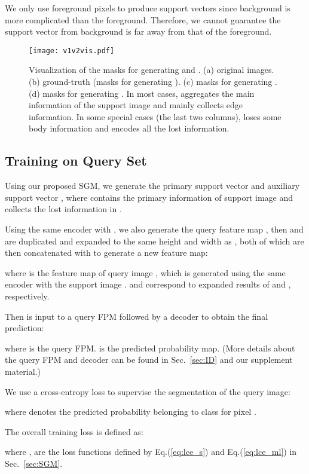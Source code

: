 \documentclass[final]{cvpr}
\begin{document}
We only use foreground pixels to produce support vectors since background is more complicated than the foreground. Therefore, we cannot guarantee the support vector from background is far away from that of the foreground. 
  
\begin{figure}
	\centering
	\texttt{[image: v1v2vis.pdf]}
	\caption{Visualization of the masks for generating  and . (a) original images. (b) ground-truth (masks for generating ). (c) masks for generating . (d) masks for generating . In most cases,  aggregates the main information of the support image and  mainly collects edge information. In some special cases (the last two columns),  loses some body information and  encodes all the lost information.}
	\label{fig:v1v2vis}
\end{figure}


\subsection{Training on Query Set}
Using our proposed SGM, we generate the primary support vector  and auxiliary support vector , where  contains the primary information of support image and  collects the lost information in . 

Using the same encoder with , we also generate the query feature map , then  and  are duplicated and expanded to the same height and width as , both of which are then concatenated with  to generate a new feature map:

where  is the feature map of query image , which is generated using the same encoder with the support image .  and  correspond to expanded results of  and , respectively.

Then  is input to a query FPM followed by a decoder to obtain the final prediction:
 
where  is the query FPM.  is the predicted probability map. (More details about the query FPM and decoder can be found in Sec.~\ref{sec:ID} and our supplement material.)

We use a cross-entropy loss to supervise the segmentation of the query image:

where  denotes the predicted probability belonging to class  for pixel .  

The overall training loss is defined as: 

where ,  are the loss functions defined by Eq.(\ref{eq:lce_s}) and Eq.(\ref{eq:lce_ml}) in Sec.~\ref{sec:SGM}. 
\end{document}
